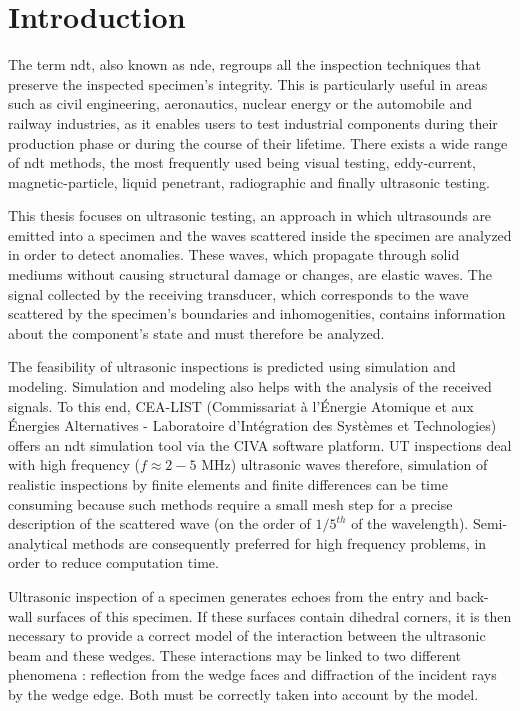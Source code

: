 \chapter*{Introduction}

The term \acrfull{ndt}, also known as \acrfull{nde}, regroups all the inspection techniques that preserve the inspected specimen's integrity. This is particularly useful in areas such as civil engineering, aeronautics, nuclear energy or the automobile and railway industries, as it enables users to test industrial components during their production phase or during the course of their lifetime. There exists a wide range of \acrshort{ndt} methods, the most frequently used being visual testing, eddy-current, magnetic-particle, liquid penetrant, radiographic and finally ultrasonic testing. 

This thesis focuses on ultrasonic testing, an approach in which ultrasounds are emitted into a specimen and the waves scattered inside the specimen are analyzed in order to detect anomalies. These waves, which propagate through solid mediums without causing structural damage or changes, are elastic waves. The signal collected by the receiving transducer, which corresponds to the wave scattered by the specimen's boundaries and inhomogenities, contains information about the component's state and must therefore be analyzed.

The feasibility of ultrasonic inspections is predicted using simulation and modeling. Simulation and modeling also helps with the analysis of the received signals. To this end, CEA-LIST (Commissariat à l’Énergie Atomique et aux Énergies Alternatives - Laboratoire d’Intégration des Systèmes et Technologies) offers an \acrshort{ndt} simulation tool via the CIVA software platform. UT inspections deal with high frequency ($f \approx 2-5$ MHz) ultrasonic waves therefore, simulation of realistic inspections by finite elements and finite differences can be time consuming because such methods require a small mesh step for a precise description of the scattered wave (on the order of $1/5^{th}$ of the wavelength). Semi-analytical methods are consequently preferred for high frequency problems, in order to reduce computation time. 

Ultrasonic inspection of a specimen generates echoes from the entry and back-wall surfaces of this specimen. If these surfaces contain dihedral corners, it is then necessary to provide a correct model of the interaction between the ultrasonic beam and these wedges. These interactions may be linked to two different phenomena : reflection from the wedge faces and diffraction of the incident rays by the wedge edge. Both must be correctly taken into account by the model.

